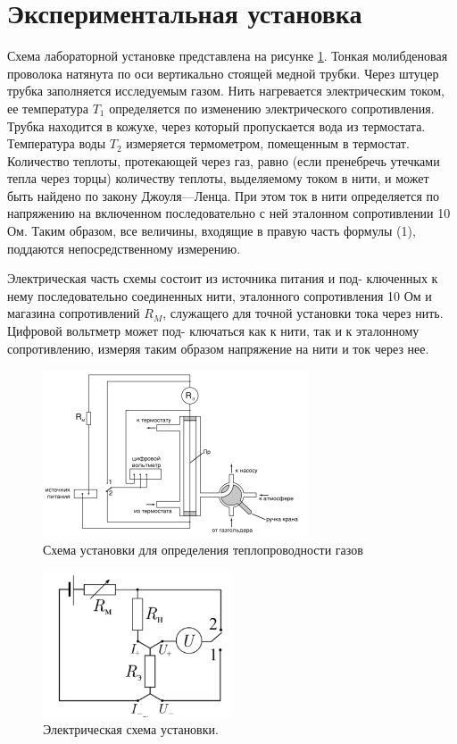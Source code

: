 \documentclass[a4paper,12pt]{article}
\begin{document}
\section{Экспериментальная установка}
Схема лабораторной установке представлена на рисунке \ref{fig:setup}. Тонкая молибденовая проволока натянута по оси вертикально стоящей медной трубки. Через штуцер трубка заполняется исследуемым газом. Нить нагревается электрическим током, ее температура $T_1$ определяется по изменению электрического сопротивления. Трубка находится в кожухе, через который пропускается вода из термостата. Температура воды $T_2$ измеряется термометром, помещенным в термостат. Количество теплоты,
протекающей через газ, равно (если пренебречь утечками тепла через торцы) количеству теплоты, выделяемому током в нити, и может быть найдено по закону Джоуля—Ленца. При этом ток в нити определяется по напряжению на включенном последовательно с ней эталонном сопротивлении 10 Ом. Таким образом, все величины, входящие в правую часть формулы (1), поддаются непосредственному измерению. \par
Электрическая часть схемы состоит из источника питания и под-
ключенных к нему последовательно соединенных нити, эталонного
сопротивления 10 Ом и магазина сопротивлений $R_M$, служащего для
точной установки тока через нить. Цифровой вольтметр может под-
ключаться как к нити, так и к эталонному сопротивлению, измеряя
таким образом напряжение на нити и ток через нее.

\begin{figure}[H]
  \centering
  \includegraphics[width=0.7\textwidth]{data/setup.png}
  \caption{Схема установки для определения теплопроводности газов\label{fig:setup}}
\end{figure}

\begin{figure}[H]
  \centering
  \includegraphics[width=0.5\textwidth]{data/circuit_fig.png}
  \caption{Электрическая схема установки.} \label{fig:circuit}
\end{figure}
\end{document}
